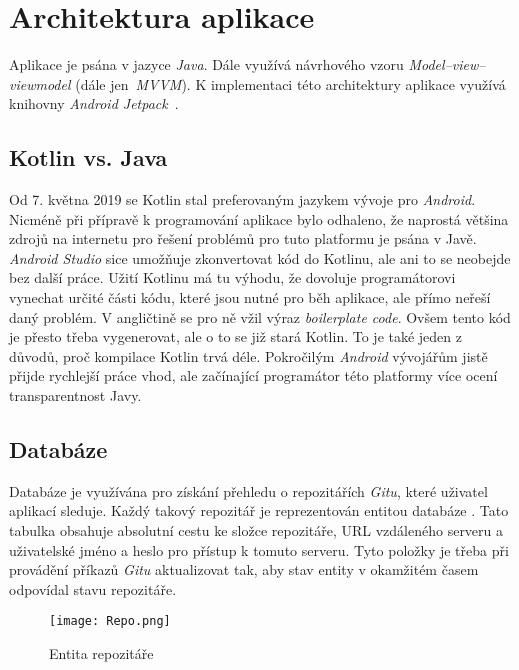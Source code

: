 \section{Architektura aplikace}
Aplikace je psána v jazyce \emph{Java}. Dále využívá návrhového vzoru \emph{Model–view–viewmodel} (dále jen~\emph{MVVM}). K implementaci této architektury aplikace využívá knihovny \emph{Android Jetpack}~.

    \subsection{Kotlin vs. Java}
    Od 7. května 2019 se Kotlin stal preferovaným jazykem vývoje pro \emph{Android}. Nicméně při přípravě k programování aplikace bylo odhaleno, že naprostá většina zdrojů na internetu pro řešení problémů pro tuto platformu je psána v Javě. \emph{Android Studio} sice umožňuje zkonvertovat kód do Kotlinu, ale ani to se neobejde bez další práce. Užití Kotlinu má tu výhodu, že dovoluje programátorovi vynechat určité části kódu, které jsou nutné pro běh aplikace, ale přímo neřeší daný problém. V angličtině se pro ně vžil výraz \emph{boilerplate code}. Ovšem tento kód je přesto třeba vygenerovat, ale o to se již stará Kotlin. To je také jeden z důvodů, proč kompilace Kotlin trvá déle. Pokročilým \emph{Android} vývojářům jistě přijde rychlejší práce vhod, ale začínající programátor této platformy více ocení transparentnost Javy.

    \newpage
    \subsection{Databáze}
    Databáze je využívána pro získání přehledu o repozitářích \emph{Gitu}, které uživatel aplikací sleduje. Každý takový repozitář je reprezentován entitou databáze . Tato tabulka obsahuje absolutní cestu ke složce repozitáře, URL vzdáleného serveru a uživatelské jméno a heslo pro přístup k tomuto serveru. Tyto položky je třeba při provádění příkazů \emph{Gitu} aktualizovat tak, aby stav entity v okamžitém časem odpovídal stavu repozitáře.

    \begin{figure}[h!]
        \centering
        \vspace{0.5cm}
        \texttt{[image: Repo.png]}
        \caption{Entita repozitáře}
        \label{RepoTable}
    \end{figure}

